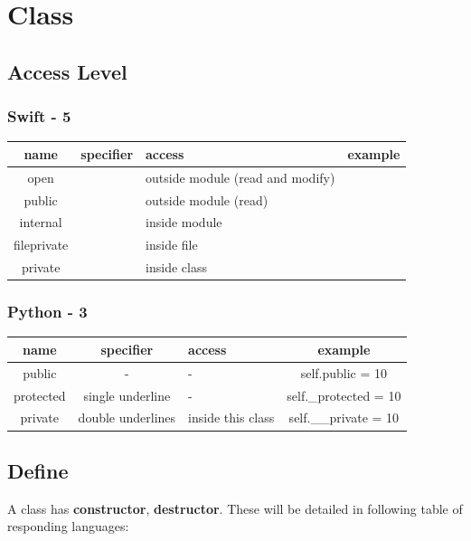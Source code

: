 \documentclass[12pt, a4paper]{report}
\begin{document}
\section{Class}
	\subsection{Access Level}
		\subsubsection{Swift - 5}
		\begin{table}[H]
		\centering
		\begin{tabular}{|c|c|l|c|}
		\toprule
		name & specifier & access & example \\
		\hline
		open & & outside module (read and modify) & \\
		\hline
		public & & outside module (read) & \\
		\hline
		internal & & inside module & \\
		\hline
		fileprivate & & inside file & \\
		\hline
		private & & inside class & \\
		\bottomrule
		\end{tabular}
		\end{table}
	
		
		\subsubsection{Python - 3}
		\begin{table}[H]
		\centering
		\begin{tabular}{|c|c|l|c|}
		\toprule
		name & specifier & access & example \\
		\hline
		public & - & - & self.public = 10  \\
		\hline
		protected & single underline & - & self.\_protected = 10 \\
		\hline
		private & double underlines & inside this class & self.\_\_private = 10\\
		\bottomrule
		\end{tabular}
		\end{table}
		

	\subsection{Define}
		A class has \textbf{constructor}, \textbf{destructor}. These will be detailed in following table of responding languages:
\end{document}
